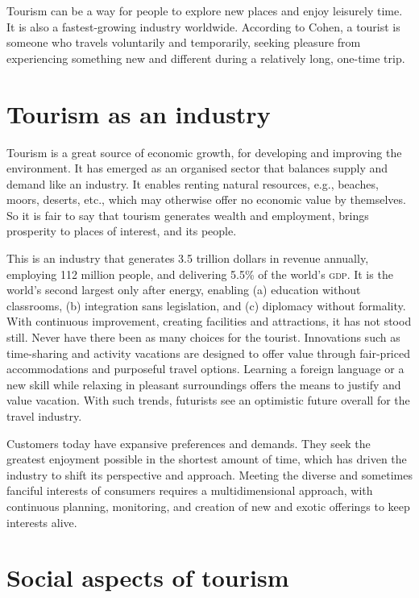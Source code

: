 Tourism can be a way for people to explore new places and enjoy leisurely time. It is also a fastest-growing industry worldwide. According to Cohen, a tourist is someone who travels voluntarily and temporarily, seeking pleasure from experiencing something new and different during a relatively long, one-time trip.


\section{Tourism as an industry} %
\label{sec:tai}

Tourism is a great source of economic growth, for developing and improving the environment. It has emerged as an organised sector that balances supply and demand like an industry. It enables renting natural resources, e.g., beaches, moors, deserts, etc., which may otherwise offer no economic value by themselves. So it is fair to say that tourism generates wealth and employment, brings prosperity to places of interest, and its people. 

This is an industry that generates 3.5 trillion dollars in revenue annually, employing 112 million people, and delivering 5.5\% of the world's \textsc{gdp}. It is the world's second largest only after energy, enabling (a) education without classrooms, (b) integration sans legislation, and (c) diplomacy without formality. With continuous improvement, creating facilities and attractions, it has not stood still. Never have there been as many choices for the tourist. Innovations such as time-sharing and activity vacations are designed to offer value through fair-priced accommodations and purposeful travel options. Learning a foreign language or a new skill while relaxing in pleasant surroundings offers the means to justify and value vacation. With such trends, futurists see an optimistic future overall for the travel industry.

Customers today have expansive preferences and demands. They seek the greatest enjoyment possible in the shortest amount of time, which has driven the industry to shift its perspective and approach. Meeting the diverse and sometimes fanciful interests of consumers requires a multidimensional approach, with continuous planning, monitoring, and creation of new and exotic offerings to keep interests alive.


\section{Social aspects of tourism} %
\label{sec:sat}

